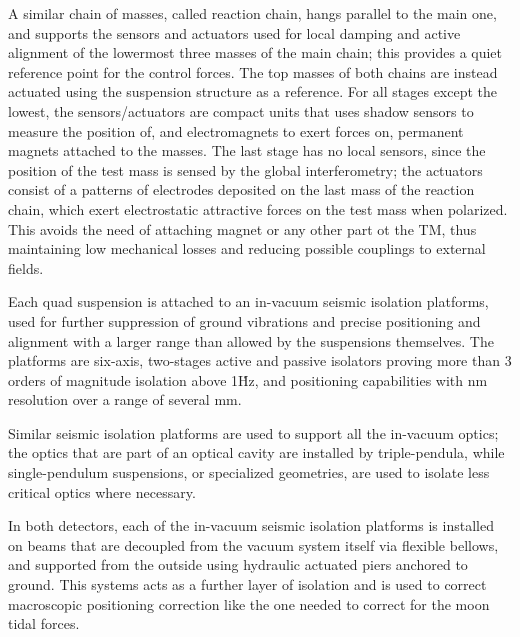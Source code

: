A similar chain of masses, called reaction chain, hangs parallel to the main one, 
and supports the sensors and actuators used for local damping and active alignment 
of the lowermost three masses of the main chain; this provides a quiet reference point 
for the control forces. The top masses of both chains are instead actuated using the 
suspension structure as a reference. For all stages except the lowest, the sensors/actuators 
are compact units that uses shadow sensors to measure the position of, and 
electromagnets to exert forces on, permanent magnets attached to the masses. 
The last stage has no local sensors, since the position of the test mass is sensed 
by the global interferometry; the actuators consist of a patterns of electrodes 
deposited on the last mass of the reaction chain, which exert electrostatic 
attractive forces on the test mass when polarized. This avoids the need of 
attaching magnet or any other part ot the TM, thus maintaining low mechanical 
losses and reducing possible couplings to external fields.

Each quad suspension is attached to an in-vacuum seismic isolation platforms, 
used for further suppression of ground vibrations and precise positioning and 
alignment with a larger range than allowed by the suspensions themselves. The 
platforms are six-axis, two-stages active and passive isolators proving more 
than 3 orders of magnitude isolation above 1\.Hz, and positioning capabilities 
with nm resolution over a range of several mm.

Similar seismic isolation platforms are used to support all the in-vacuum optics; 
the optics that are part of an optical cavity are installed by triple-pendula, while 
single-pendulum suspensions, or specialized geometries, are used to isolate 
less critical optics where necessary.

In both detectors, each of the in-vacuum seismic isolation platforms is 
installed on beams that are decoupled from the vacuum system itself via 
flexible bellows, and supported from the outside using hydraulic actuated 
piers anchored to ground. This systems acts as a further layer of isolation 
and is used to correct macroscopic positioning correction like the one needed 
to correct for the moon tidal forces.


